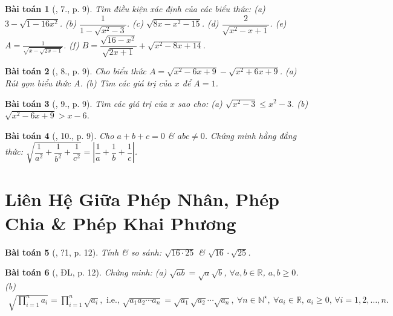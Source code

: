 \documentclass{article}
\newtheorem{baitoan}{Bài toán}
\begin{document}
\begin{baitoan}[\cite{Binh_Toan_9_tap_1}, 7., p. 9]
	Tìm điều kiện xác định của các biểu thức: (a) $3 - \sqrt{1 - 16x^2}$. (b) $\dfrac{1}{1 - \sqrt{x^2 - 3}}$. (c) $\sqrt{8x - x^2 - 15}$. (d) $\dfrac{2}{\sqrt{x^2 - x + 1}}$. (e) $A = \frac{1}{\sqrt{x - \sqrt{2x - 1}}}$. (f) $B = \dfrac{\sqrt{16 - x^2}}{\sqrt{2x + 1}} + \sqrt{x^2 - 8x + 14}$.
\end{baitoan}

\begin{baitoan}[\cite{Binh_Toan_9_tap_1}, 8., p. 9]
	Cho biểu thức $A = \sqrt{x^2 - 6x + 9} - \sqrt{x^2 + 6x + 9}$. (a) Rút gọn biểu thức $A$. (b) Tìm các giá trị của $x$ để $A = 1$.
\end{baitoan}

\begin{baitoan}[\cite{Binh_Toan_9_tap_1}, 9., p. 9]
	Tìm các giá trị của $x$ sao cho: (a) $\sqrt{x^2 - 3}\le x^2 - 3$. (b) $\sqrt{x^2 - 6x + 9} > x - 6$.
\end{baitoan}

\begin{baitoan}[\cite{Binh_Toan_9_tap_1}, 10., p. 9]
	Cho $a + b + c = 0$ \& $abc\ne0$. Chứng minh hằng đẳng thức: $\sqrt{\dfrac{1}{a^2} + \dfrac{1}{b^2} + \dfrac{1}{c^2}} = \left|\dfrac{1}{a} + \dfrac{1}{b} + \dfrac{1}{c}\right|$.
\end{baitoan}


\section{Liên Hệ Giữa Phép Nhân, Phép Chia \& Phép Khai Phương}

\begin{baitoan}[\cite{SGK_Toan_9_tap_1}, ?1, p. 12]
	Tính \& so sánh: $\sqrt{16\cdot25}$ \& $\sqrt{16}\cdot\sqrt{25}$.	
\end{baitoan}

\begin{baitoan}[\cite{SGK_Toan_9_tap_1}, ĐL, p. 12]
	Chứng minh: (a) $\sqrt{ab} = \sqrt{a}\sqrt{b}$, $\forall a,b\in\mathbb{R}$, $a,b\ge0$. (b)
	\begin{align*}
		\sqrt{\prod_{i=1}^n a_i} = \prod_{i=1}^n \sqrt{a_i},\mbox{ i.e., }\sqrt{a_1a_2\cdots a_n} = \sqrt{a_1}\sqrt{a_2}\cdots\sqrt{a_n},\ \forall n\in\mathbb{N}^\star,\ \forall a_i\in\mathbb{R},\,a_i\ge0,\,\forall i = 1,2,\ldots,n.
	\end{align*}
\end{baitoan}
\end{document}
